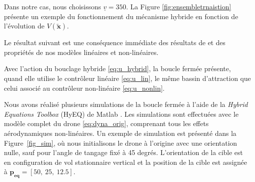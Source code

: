 Dans notre cas, nous choisissons $\underline{v}= 350$. La Figure \ref*{fig:ensembletrnaistion} présente un exemple du fonctionnement du mécanisme hybride en fonction de l'évolution de $V(\boldsymbol{\tilde x})$.


Le résultat suivant est une conséquence immédiate des résultats de \cite[Ex. 1.7]{65} et des propriétés de nos modèles linéaires et non-linéaires.

\begin{proposition}
    Avec l'action du bouclage hybride \eqref{eq:u_hybrid}, la boucle fermée présente, quand elle utilise le contrôleur linéaire \eqref{eq:u_lin}, le même bassin d'attraction que celui associé au contrôleur non-linéaire \eqref{eq:u_nonlin}.
\end{proposition}

Nous avons réalisé plusieurs simulations de la boucle fermée à l'aide de la \textit{Hybrid Equations Toolbox} (HyEQ) de Matlab \cite{sanfelice_2017}. Les simulations sont effectuées avec le modèle complet du drone \eqref{eq:dyna_orig}, comprenant tous les effets aérodynamiques non-linéaires. Un exemple de simulation est présenté dans la Figure~\ref{fig_sim}, où nous initialisons le drone à l'origine avec une orientation nulle, sauf pour l'angle de tangage fixé à 45 degrés. L'orientation de la cible est en configuration de vol stationnaire vertical et la position de la cible est assignée à $\boldsymbol{p_{\text{eq}}} = [50,~25,~12.5]$.

